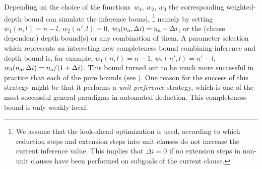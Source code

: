 Depending on the choice of the functions~$w_1$, $w_2$, $w_3$ the
corresponding weighted-depth bound can simulate the inference bound,%
\footnote{We assume that the look-ahead optimization is used, according to
which reduction steps and extension steps into unit clauses do not increase 
the current inference value. This implies that $\Delta i = 0$ if no
extension steps in non-unit clauses have been performed on subgoals of
the current clause.}
namely by setting $w_1(n,l) = n-l$, $w_2(n',l) = 0$, 
$w_3(n_{\mbox{\scriptsize a}},\Delta i) = n_{\mbox{\scriptsize a}} - \Delta i$,
or the (clause dependent) depth bound(s) or any combination of them.
A parameter selection which represents an interesting new completeness
bound combining inference and depth bound is, for example,
$w_1(n,l) = n-1$, $w_2(n',l) = n' - l$, 
$w_3(n_{\mbox{\scriptsize a}},\Delta i) = n_{\mbox{\scriptsize a}} / (1 + \Delta i)$.
This bound turned out to be much more successful in practice 
than each of the pure bounds (see \cite{LI96}).
One reason for the success of this strategy might be that it performs
a {\em unit preference\/} strategy, which is one of the most successful
general paradigms in automated deduction.
This completeness bound is only weakly local.

